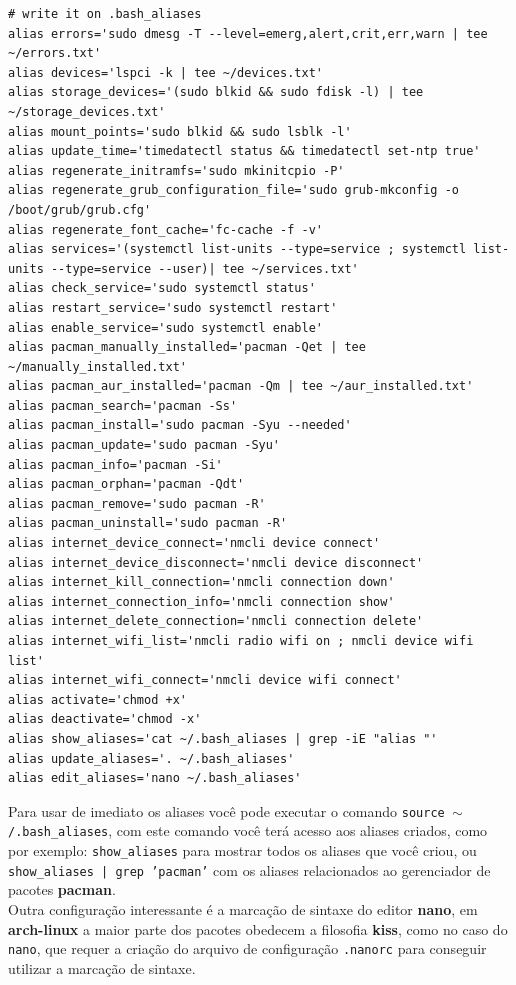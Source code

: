 \documentclass[12pt,a4paper]{article}
\begin{document}
\begin{lstlisting}
# write it on .bash_aliases 
alias errors='sudo dmesg -T --level=emerg,alert,crit,err,warn | tee ~/errors.txt'
alias devices='lspci -k | tee ~/devices.txt'
alias storage_devices='(sudo blkid && sudo fdisk -l) | tee ~/storage_devices.txt'
alias mount_points='sudo blkid && sudo lsblk -l'
alias update_time='timedatectl status && timedatectl set-ntp true'
alias regenerate_initramfs='sudo mkinitcpio -P'
alias regenerate_grub_configuration_file='sudo grub-mkconfig -o /boot/grub/grub.cfg'
alias regenerate_font_cache='fc-cache -f -v'
alias services='(systemctl list-units --type=service ; systemctl list-units --type=service --user)| tee ~/services.txt'
alias check_service='sudo systemctl status'
alias restart_service='sudo systemctl restart'
alias enable_service='sudo systemctl enable'
alias pacman_manually_installed='pacman -Qet | tee ~/manually_installed.txt'
alias pacman_aur_installed='pacman -Qm | tee ~/aur_installed.txt'
alias pacman_search='pacman -Ss'
alias pacman_install='sudo pacman -Syu --needed'
alias pacman_update='sudo pacman -Syu'
alias pacman_info='pacman -Si'
alias pacman_orphan='pacman -Qdt'
alias pacman_remove='sudo pacman -R'
alias pacman_uninstall='sudo pacman -R'
alias internet_device_connect='nmcli device connect'
alias internet_device_disconnect='nmcli device disconnect'
alias internet_kill_connection='nmcli connection down'
alias internet_connection_info='nmcli connection show'
alias internet_delete_connection='nmcli connection delete'
alias internet_wifi_list='nmcli radio wifi on ; nmcli device wifi list'
alias internet_wifi_connect='nmcli device wifi connect'
alias activate='chmod +x'
alias deactivate='chmod -x'
alias show_aliases='cat ~/.bash_aliases | grep -iE "alias "'
alias update_aliases='. ~/.bash_aliases'
alias edit_aliases='nano ~/.bash_aliases'
\end{lstlisting}

\vspace{\baselineskip}

Para usar de imediato os aliases você pode executar o comando \texttt{source $\sim$/.bash\_aliases}, com este comando você terá acesso aos aliases criados, como por exemplo: \texttt{show\_aliases} para mostrar todos os aliases que você criou, ou \texttt{show\_aliases | grep 'pacman'} com os aliases relacionados ao gerenciador de pacotes \textbf{pacman}.\\

Outra configuração interessante é a marcação de sintaxe do editor \textbf{nano}, em \textbf{arch-linux} a maior parte dos pacotes obedecem a filosofia \textbf{kiss}, como no caso do \texttt{nano}, que requer a criação do arquivo de configuração \texttt{.nanorc} para conseguir utilizar a marcação de sintaxe. \\
\end{document}
